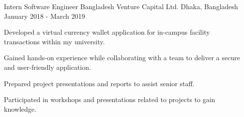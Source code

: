 
\begin{cventries}

  \cventry
    {Intern Software Engineer}
    {Bangladesh Venture Capital Ltd.}
    {Dhaka, Bangladesh}
    {January 2018 - March 2019}
    {
      \begin{cvitems}
        \item {Developed a virtual currency wallet application for in-campus facility transactions within my university.}
        \item {Gained hands-on experience while collaborating with a team to deliver a secure and user-friendly application.}
        \item {Prepared project presentations and reports to assist senior staff.}
        \item {Participated in workshops and presentations related to projects to gain knowledge.}
      \end{cvitems}
    }

\end{cventries}
